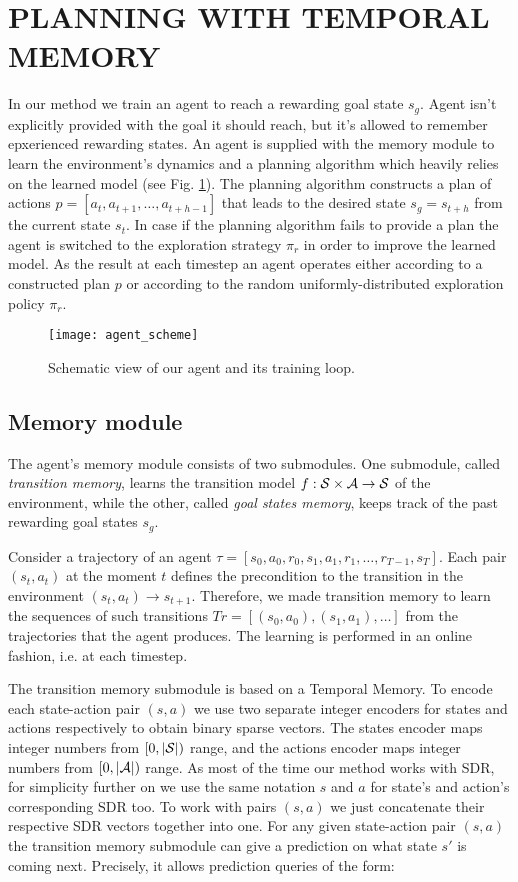 \documentclass[a4paper,twoside]{article}
\begin{document}
\section{\uppercase{Planning with Temporal Memory}}

In our method we train an agent to reach a rewarding goal state $s_g$. Agent isn't explicitly provided with the goal it should reach, but it's allowed to remember epxerienced rewarding states. An agent is supplied with the memory module to learn the environment's dynamics and a planning algorithm which heavily relies on the learned model (see Fig. \ref{fig_agent_scheme}). The planning algorithm constructs a plan of actions $p = [a_t, a_{t+1}, \dots, a_{t+h-1}]$ that leads to the desired state $s_g = s_{t+h}$ from the current state $s_t$. In case if the planning algorithm fails to provide a plan the agent is switched to the exploration strategy $\pi_r$ in order to improve the learned model. As the result at each timestep an agent operates either according to a constructed plan $p$ or according to the random uniformly-distributed exploration policy $\pi_r$.

\begin{figure}
  \centering
  \texttt{[image: agent\_scheme]}
  \caption{Schematic view of our agent and its training loop.} \label{fig_agent_scheme}
\end{figure}

\subsection{Memory module} \label{sec_MemoryModule}

The agent's memory module consists of two submodules. One submodule, called \textit{transition memory}, learns the transition model $f: \mathcal{S} \times \mathcal{A} \rightarrow \mathcal{S}$ of the environment, while the other, called \textit{goal states memory}, keeps track of the past rewarding goal states $s_g$.

Consider a trajectory of an agent $\tau = [s_0, a_0, r_0, s_1, a_1, r_1, \dots, r_{T-1}, s_T]$. Each pair $(s_t, a_t)$ at the moment $t$ defines the precondition to the transition in the environment $(s_t, a_t) \rightarrow s_{t+1}$. Therefore, we made transition memory to learn the sequences of such transitions $Tr = [(s_0, a_0), (s_1, a_1), \dots]$ from the trajectories that the agent produces. The learning is performed in an online fashion, i.e. at each timestep.

The transition memory submodule is based on a Temporal Memory. To encode each state-action pair $(s, a)$ we use two separate integer encoders for states and actions respectively to obtain binary sparse vectors. The states encoder maps integer numbers from $[0, |\mathcal{S}|)$ range, and the actions encoder maps integer numbers from $[0, |\mathcal{A}|)$ range. As most of the time our method works with SDR, for simplicity further on we use the same notation $s$ and $a$ for state's and action's corresponding SDR too. To work with pairs $(s, a)$ we just concatenate their respective SDR vectors together into one. For any given state-action pair $(s, a)$ the transition memory submodule can give a prediction on what state $s'$ is coming next. Precisely, it allows prediction queries of the form:
\end{document}
